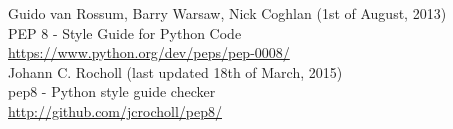 \documentclass[10pt,a4paper,notitlepage]{report}
\begin{document}
\begin{thebibliography}{99}
	Guido van Rossum, Barry Warsaw, Nick Coghlan (1st of August, 2013)\\
	PEP 8 - Style Guide for Python Code\\
	\url{https://www.python.org/dev/peps/pep-0008/}\\
	
	Johann C. Rocholl (last updated 18th of March, 2015)\\
	pep8 - Python style guide checker\\
	\url{http://github.com/jcrocholl/pep8/}

\end{thebibliography}
\end{document}
